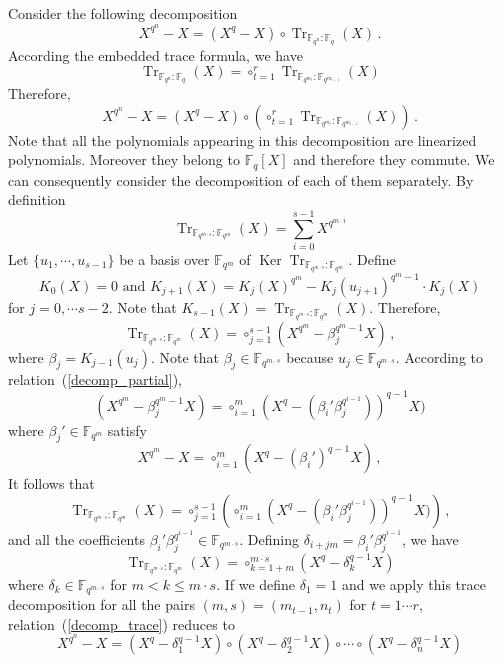 \documentclass{sig-alternate}
\newcommand{\ff}[1]{\mathbb{F}_{#1}}
\newcommand{\qq}{q}
\newcommand{\nn}{n}
\newcommand{\basef}{\ff{\qq}}
\DeclareMathOperator{\Tr}{Tr}
\DeclareMathOperator{\Ker}{Ker}
\newcommand{\tr}[2]{\Tr_{\ff{#1}:\ff{#2}}}
\begin{document}
\noindent Consider the following decomposition
$$X^{\qq^{\nn}}-X=(X^{\qq}-X) \circ   \tr{\qq^\nn}{\qq}(X)  \,.  $$
According the embedded trace formula, we have
$$\tr{\qq^\nn}{\qq}(X)=\circ_{t=1}^r  \tr{\qq^{m_t}}{\qq^{m_{t-1}}}(X) $$
Therefore, 
 \begin{equation}
 \label{decomp_trace}
 X^{\qq^{\nn}}-X=(X^{\qq}-X) \circ \left( \circ_{t=1}^r  \tr{\qq^{m_t}}{\qq^{m_{t-1}}}(X) \right)     \,. 
\end{equation}
Note that all the polynomials appearing in this decomposition are linearized polynomials. Moreover they belong to $\basef[X]$ and therefore they commute.
 We can consequently consider the decomposition of each of them separately. By definition
 $$  \tr{\qq^{m \cdot s}}{\qq^{m}}(X) =\sum_{i=0}^{s-1} X^{\qq^{m\cdot i}}  $$
 Let $\{u_1, \cdots, u_{s-1}\}$ be a basis over $\mathbb{F}_{\qq^{m}}$ of $\Ker  \tr{\qq^{m \cdot s}}{\qq^{m}}$.
 Define  
 $$K_0(X)=0 \mbox{ and } K_{j+1}(X)=K_j(X)^{\qq^{m}}-K_j(u_{j+1})^{\qq^{m}-1} \cdot K_j(X)$$
 for $j=0, \cdots s-2$. Note that $K_{s-1}(X)=\tr{\qq^{m \cdot s}}{\qq^{m}}(X)$.
 Therefore, 
 \begin{equation}
 \label{betai}
\tr{\qq^{m \cdot s}}{\qq^{m}}(X)=\circ_{j=1}^{s-1} (X^{\qq^{m}} - \beta_j^{\qq^{m}-1}   X) \,,
\end{equation}
 where $\beta_j=K_{j-1}(u_{j})$. Note that $\beta_j \in \mathbb{F}_{\qq^{m \cdot s}}$ because  $u_j \in \mathbb{F}_{\qq^{m \cdot s}}$. According to relation~(\ref{decomp_partial}),
$$(X^{\qq^{m}}- \beta_j^{\qq^{m}-1} X)=\circ_{i=1}^{m} (X^\qq-( \beta_i' \beta_j^{\qq^{i-1}}) )^{q-1} X)$$
where $\beta_j' \in \mathbb{F}_{\qq^m}$ satisfy
\begin{equation}
\label{betajprim}
X^{\qq^{m}}-X=\circ_{i=1}^{m} (X^{\qq}-(\beta_i')^{\qq-1} X)\,,
\end{equation}
It follows that
 $$\tr{\qq^{m \cdot s}}{\qq^{m}}(X)=\circ_{j=1}^{s-1} \left( \circ_{i=1}^{m} (X^\qq-( \beta_i' \beta_j^{\qq^{i-1}}) )^{q-1} X)   \right) \,,$$
and all the coefficients $\beta_i' \beta_j^{\qq^{i-1}} \in \mathbb{F}_{\qq^{m \cdot s}}$.
Defining $\delta_{i+jm}=\beta_i' \beta_j^{\qq^{i-1}} $, we have
$$\tr{\qq^{m \cdot s}}{\qq^{m}}(X)=\circ_{k=1+m}^{m \cdot s}  (X^{\qq} -\delta_k^{\qq-1} X )$$
where $\delta_k \in \mathbb{F}_{\qq^{m \cdot s}}$ for $m  < k \le m \cdot s$. If we define $\delta_1=1$ and we apply this trace decomposition for all the pairs $(m,s)=(m_{t-1},n_t)$ for $t=1 \cdots r$, 
relation~(\ref{decomp_trace}) reduces to  
$$X^{\qq^{\nn}}-X=(X^{\qq} -\delta_1^{\qq-1} X ) \circ (X^{\qq} -\delta_2^{\qq-1} X ) \circ \cdots \circ (X^{\qq} -\delta_n^{\qq-1} X )$$
\end{document}
